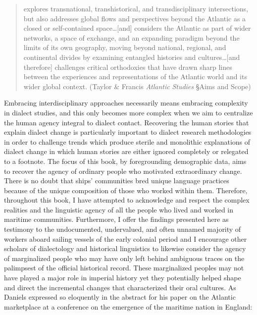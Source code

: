 \begin{quotation}
explores transnational, transhistorical, and transdisciplinary intersections, but also addresses global flows and perspectives beyond the Atlantic as a closed or self-contained space…[and] considers the Atlantic as part of wider networks, a space of exchange, and an expanding paradigm beyond the limits of its own geography, moving beyond national, regional, and continental divides by examining entangled histories and cultures…[and therefore] challenges critical orthodoxies that have drawn sharp lines between the experiences and representations of the Atlantic world and its wider global context. (Taylor \& Francis \citealt{Group2016} \textit{Atlantic} \textit{Studies} §Aims and Scope)\end{quotation}

Embracing interdisciplinary approaches necessarily means embracing complexity in dialect studies, and this only becomes more complex when we aim to centralize the human agency integral to dialect contact. Recovering the human stories that explain dialect change is particularly important to dialect research methodologies in order to challenge trends which produce sterile and monolithic explanations of dialect change in which human stories are either ignored completely or relegated to a footnote. The focus of this book, by foregrounding demographic data, aims to recover the agency of ordinary people who motivated extraordinary change. There is no doubt that ships’ communities bred unique language practices because of the unique composition of those who worked within them. Therefore, throughout this book, I have attempted to acknowledge and respect the complex realities and the linguistic agency of all the people who lived and worked in maritime communities. Furthermore, I offer the findings presented here as testimony to the undocumented, undervalued, and often unnamed majority of workers aboard sailing vessels of the early colonial period and I encourage other scholars of dialectology and historical linguistics to likewise consider the agency of marginalized people who may have only left behind ambiguous traces on the palimpsest of the official historical record. These marginalized peoples may not have played a major role in imperial history yet they potentially helped shape and direct the incremental changes that characterized their oral cultures. As Daniels expressed so eloquently in the abstract for his paper on the Atlantic marketplace at a conference on the emergence of the maritime nation in England:


